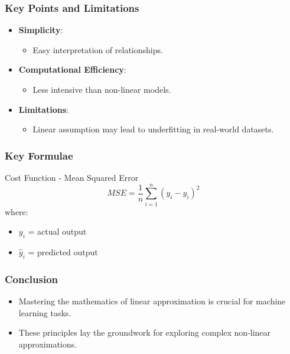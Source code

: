 \documentclass[aspectratio=169]{beamer}
\begin{document}
\begin{frame}[fragile]
    \frametitle{Key Points and Limitations}
    \begin{itemize}
        \item \textbf{Simplicity}:
        \begin{itemize}
            \item Easy interpretation of relationships.
        \end{itemize}
        \item \textbf{Computational Efficiency}:
        \begin{itemize}
            \item Less intensive than non-linear models.
        \end{itemize}
        \item \textbf{Limitations}:
        \begin{itemize}
            \item Linear assumption may lead to underfitting in real-world datasets.
        \end{itemize}
    \end{itemize}
\end{frame}

\begin{frame}[fragile]
    \frametitle{Key Formulae}
    \begin{block}{Cost Function - Mean Squared Error}
        \begin{equation}
            MSE = \frac{1}{n} \sum_{i=1}^{n} (y_i - \hat{y}_i)^2
        \end{equation}
        where:
        \begin{itemize}
            \item \(y_i\) = actual output
            \item \(\hat{y}_i\) = predicted output
        \end{itemize}
    \end{block}
\end{frame}

\begin{frame}[fragile]
    \frametitle{Conclusion}
    \begin{itemize}
        \item Mastering the mathematics of linear approximation is crucial for machine learning tasks.
        \item These principles lay the groundwork for exploring complex non-linear approximations.
    \end{itemize}
\end{frame}
\end{document}
